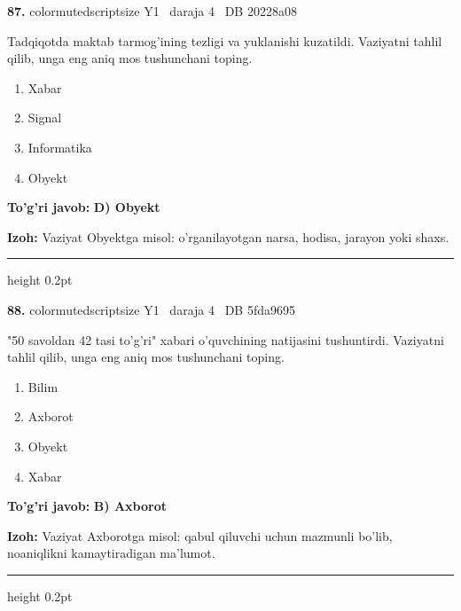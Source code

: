 \documentclass[10pt,a4paper,oneside]{article}
\begin{document}
\noindent\textbf{\color{ink}87.}  {color{muted}scriptsize Y1 \textbullet\ daraja 4 \textbullet\ DB 20228a08}
\par
Tadqiqotda maktab tarmog'ining tezligi va yuklanishi kuzatildi. Vaziyatni tahlil qilib, unga eng aniq mos tushunchani toping.
\begin{enumerate}[label=\Alph*),leftmargin=9mm]
\item Xabar
\item Signal
\item Informatika
\item Obyekt
\end{enumerate}
\begin{tcolorbox}[enhanced,breakable,colback=teal!4,colframe=teal!50!black,boxrule=0.5pt,arc=1.1mm,left=3mm,right=3mm,top=1.7mm,bottom=1.7mm,before skip=2mm,after skip=2mm]
\textbf{\color{teal}To'g'ri javob:} \textbf{D) Obyekt}
\par\smallskip
\textbf{Izoh:} Vaziyat Obyektga misol: o'rganilayotgan narsa, hodisa, jarayon yoki shaxs.
\end{tcolorbox}
\vspace{2mm}\hrule height 0.2pt \vspace{3mm}

\noindent\textbf{\color{ink}88.}  {color{muted}scriptsize Y1 \textbullet\ daraja 4 \textbullet\ DB 5fda9695}
\par
"50 savoldan 42 tasi to'g'ri" xabari o'quvchining natijasini tushuntirdi. Vaziyatni tahlil qilib, unga eng aniq mos tushunchani toping.
\begin{enumerate}[label=\Alph*),leftmargin=9mm]
\item Bilim
\item Axborot
\item Obyekt
\item Xabar
\end{enumerate}
\begin{tcolorbox}[enhanced,breakable,colback=teal!4,colframe=teal!50!black,boxrule=0.5pt,arc=1.1mm,left=3mm,right=3mm,top=1.7mm,bottom=1.7mm,before skip=2mm,after skip=2mm]
\textbf{\color{teal}To'g'ri javob:} \textbf{B) Axborot}
\par\smallskip
\textbf{Izoh:} Vaziyat Axborotga misol: qabul qiluvchi uchun mazmunli bo'lib, noaniqlikni kamaytiradigan ma'lumot.
\end{tcolorbox}
\vspace{2mm}\hrule height 0.2pt \vspace{3mm}
\end{document}
